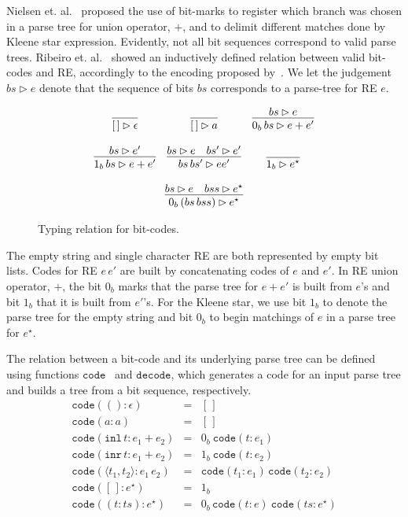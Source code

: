 \documentclass[review]{elsarticle}
\newcommand{\inl}{\ensuremath{\texttt{inl}}}
\newcommand{\inr}{\ensuremath{\texttt{inr}}}
\newcommand{\code}{\ensuremath{\texttt{code}}}
\newcommand{\decodee}{\ensuremath{\texttt{decode}}}
\theoremstyle{definition}
\begin{document}
Nielsen et. al.~\cite{Lasse2011} proposed the
use of bit-marks to register which branch was chosen in a parse tree for union
operator, $+$, and to delimit different matches done by Kleene star expression.
Evidently, not all bit sequences correspond to valid parse trees. Ribeiro et. al.~\cite{Ribeiro2017}
showed an inductively defined relation between valid bit-codes and RE, accordingly to the encoding
proposed by~\cite{Lasse2011}. We let the judgement $bs \rhd e$ denote that the sequence of bits
$bs$ corresponds to a parse-tree for RE $e$.

\begin{figure}[h]
	\[
	\begin{array}{ccc}
	\infer{[\,] \rhd \epsilon}{} &
	\infer{[\,] \rhd a}{}  &
	\infer{0_b\, bs \rhd e + e'}{bs \rhd e} \\ \\
	\infer{1_b\,bs \rhd e + e'}{bs \rhd e'} &
	\infer{bs\,bs' \rhd e e'}{bs \rhd e & bs' \rhd e'} &
	\infer{ 1_b \rhd e^\star}{} \\ \\
	\multicolumn{3}{c}{
		\infer{0_b\,(bs\,bss) \rhd e^\star}{bs \rhd e & bss \rhd e^\star}
	}
	\end{array}
	\]
	\centering
	\caption{Typing relation for bit-codes.}
	\label{figure:typing-bitcodes}
\end{figure}

The empty string and single character RE are both represented by empty bit lists. Codes for RE $e\,e'$ are
built by concatenating codes of $e$ and $e'$. In RE union operator, $+$, the bit $0_b$ marks that the
parse tree for $e + e'$ is built from $e$'s and bit $1_b$ that it is built from $e'$'s. For the Kleene
star, we use bit $1_b$ to denote the parse tree for the empty string and bit $0_b$ to begin matchings of $e$
in a parse tree for $e^\star$.

The relation between a bit-code and its underlying parse tree can be defined using functions
\code~ and \decodee, which generates a code for an input parse tree and builds a tree from a bit sequence, 
respectively. 
\[
\begin{array}{lcl}
   \code (() : \epsilon) & = & [\,]\\
   \code (a : a)         & = & [\,]\\
   \code (\inl\,t : e_1 + e_2) & = & 0_b\:\code(t : e_1)\\ 
   \code (\inr\,t : e_1 + e_2) & = & 1_b\:\code(t : e_2)\\
   \code (\langle t_1, t_2\rangle : e_1\,e_2) & = & \code (t_1 : e_1)\,\code(t_2 : e_2)\\
   \code ([\,] : e^\star) & = & 1_b\\
   \code ((t : ts) : e^\star) & = & 0_b\,\code (t : e)\:\code(ts : e^\star)\\ 
\end{array}
\]
\end{document}

